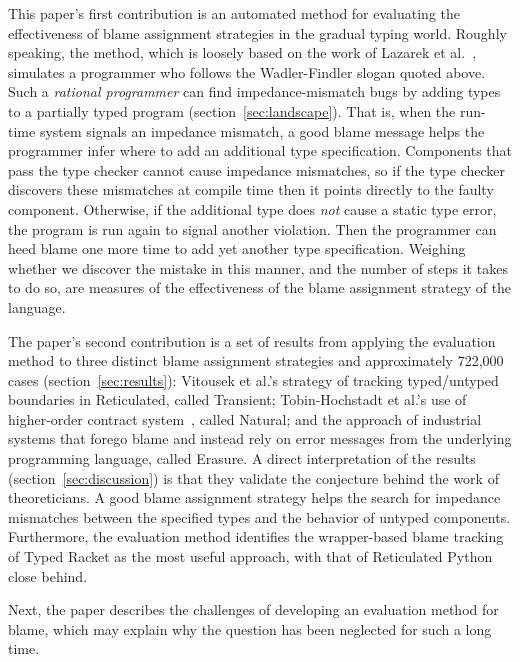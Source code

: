 This paper's first contribution is an automated method for evaluating the
effectiveness of blame assignment strategies in the gradual typing world.
Roughly speaking, the method, which is
loosely based on the work of Lazarek et al.~\cite{lksfd-popl-2020},
simulates a programmer who follows the Wadler-Findler slogan quoted above.
Such a \emph{rational programmer} can find impedance-mismatch
bugs by adding types to a partially typed program (section~\ref{sec:landscape}). That is, when the
run-time system signals an impedance mismatch, a good blame message helps
the programmer infer where to add an additional type specification.
Components that pass the type checker cannot cause impedance mismatches,
so if the type checker discovers these mismatches at compile time then it points
directly to the faulty component. Otherwise, if the
additional type does {\em not\/} cause a static type error, the program
is run again to signal another violation. Then the programmer can heed
blame one more time to add yet another type specification.
Weighing whether we discover the mistake in this manner, and the number of
steps it takes to do so, are measures of the effectiveness
of the blame assignment strategy of the language.

The paper's second contribution is a set of results from applying the evaluation
method to three distinct blame assignment strategies and approximately
722,000 cases (section~\ref{sec:results}): Vitousek et
al.'s strategy of tracking typed/untyped boundaries in Reticulated, called Transient;
Tobin-Hochstadt et al.'s use of higher-order contract system~\cite{ff-icfp-2002,
mf-toplas-2009}, called Natural; and the approach of industrial systems that forego blame
and instead rely on error messages from the
underlying programming language, called Erasure. A direct interpretation of the results
(section~\ref{sec:discussion}) is that
they validate the conjecture behind the work of theoreticians. A good blame assignment
strategy helps the search for impedance mismatches between the specified types
and the behavior of untyped components.
Furthermore, the evaluation method
identifies the wrapper-based blame tracking of Typed Racket as the most
useful approach, with that of Reticulated Python close behind.

Next, the paper describes the challenges of developing an evaluation
method for blame, which may explain why the question has been neglected for such
a long time.


